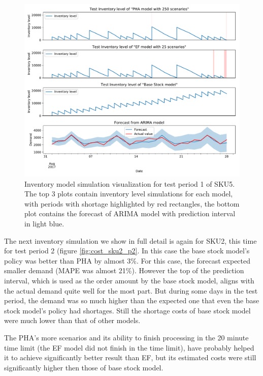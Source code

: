 \documentclass[11pt,a4paper]{article}
\begin{document}
\begin{figure}
  \includegraphics[width=1\linewidth]{figures/cost_sku5_1.pdf}
  \caption[Inventory model simulation visualization for test period 1 of SKU5]{Inventory model simulation visualization for test period 1 of SKU5. The top 3 plots contain inventory level simulations for each model, with periods with shortage highlighted by red rectangles, the bottom plot contains the forecast of ARIMA model with prediction interval in light blue.}
  \label{fig:cost_sku5_p1}
\end{figure}

\newpage



The next inventory simulation we show in full detail is again for SKU2, this time for test period 2 (figure \ref{fig:cost_sku2_p2}. In this case the base stock model's policy was better than PHA by almost 3\%. For this case, the forecast expected smaller demand (MAPE was almost 21\%). However the top of the prediction interval, which is used as the order amount by the base stock model, aligns with the actual demand quite well for the most part. But during some days in the test period, the demand was so much higher than the expected one that even the base stock model's policy had shortages. Still the shortage costs of base stock model were much lower than that of other models. 

The PHA's more scenarios and its ability to finish processing in the 20 minute time limit (the EF model did not finish in the time limit), have probably helped it to achieve significantly better result than EF, but its estimated costs were still significantly higher then those of base stock model.
\end{document}
